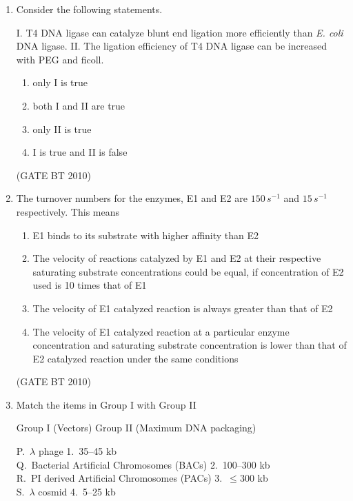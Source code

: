\documentclass[journal,12pt,onecolumn]{IEEEtran}
\theoremstyle{remark}
\begin{document}
\begin{enumerate}
\item Consider the following statements.  

I. T4 DNA ligase can catalyze blunt end ligation more efficiently than \textit{E. coli} DNA ligase.  
II. The ligation efficiency of T4 DNA ligase can be increased with PEG and ficoll.  

\begin{enumerate}
   \item only I is true  
   \item both I and II are true  
   \item only II is true  
   \item I is true and II is false  
\end{enumerate}
\hfill (GATE BT 2010)

\item The turnover numbers for the enzymes, E1 and E2 are $150 \, s^{-1}$ and $15 \, s^{-1}$ respectively. This means  

\begin{enumerate}
   \item E1 binds to its substrate with higher affinity than E2  
   \item The velocity of reactions catalyzed by E1 and E2 at their respective saturating substrate concentrations could be equal, if concentration of E2 used is 10 times that of E1  
   \item The velocity of E1 catalyzed reaction is always greater than that of E2  
   \item The velocity of E1 catalyzed reaction at a particular enzyme concentration and saturating substrate concentration is lower than that of E2 catalyzed reaction under the same conditions  
\end{enumerate}
\hfill (GATE BT 2010)

\item Match the items in Group I with Group II  

Group I (Vectors) \hspace{2cm} Group II (Maximum DNA packaging)  

P.\ $\lambda$ phage\hspace{2.6cm} 1.\ 35--45 kb\\
Q.\ Bacterial Artificial Chromosomes (BACs)\hspace{0.8cm} 2.\ 100--300 kb\\
R.\ PI derived Artificial Chromosomes (PACs)\hspace{0.7cm} 3.\ $\leq 300$ kb\\
S.\ $\lambda$ cosmid\hspace{2.7cm} 4.\ 5--25 kb


\end{enumerate}
\end{document}
